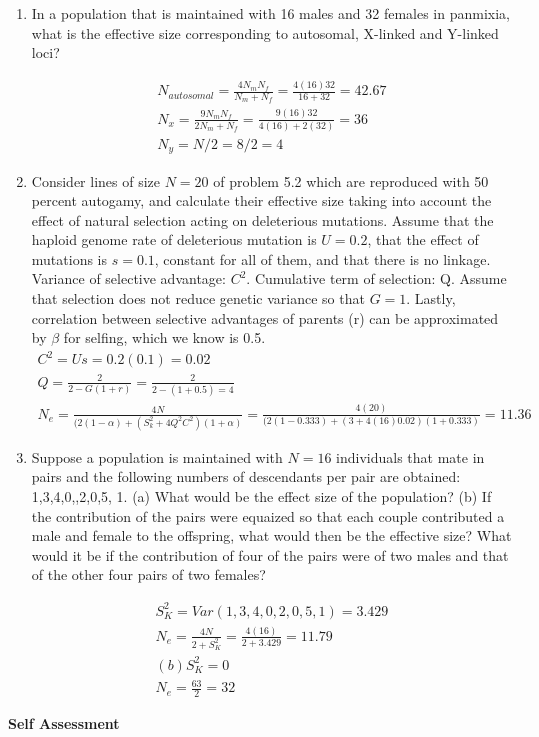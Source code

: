 \documentclass[12pt]{amsart}
\begin{document}
\begin{enumerate}
\item In a population that is maintained with 16 males and 32 females in panmixia, what is the effective size corresponding to autosomal, X-linked and Y-linked loci?

\begin{gather*}
N_{autosomal} = \frac{4N_mN_f}{N_m + N_f} = \frac{4(16)32}{16 + 32} =  42.67\\
N_x = \frac{9N_mN_f}{2N_m + N_f} = \frac{9(16)32}{4(16) + 2(32)} = 36\\
N_y = N/2 = 8/2 = 4
\end{gather*}

\item Consider lines of size $N = 20$ of problem 5.2 which are reproduced with 50 percent autogamy, and calculate their effective size taking into account the effect of natural selection acting on deleterious mutations. Assume that the haploid genome rate of deleterious mutation is $U = 0.2$, that the effect of mutations is $s = 0.1$, constant for all of them, and that there is no linkage.\\
Variance of selective advantage: $C^2$. Cumulative term of selection: Q. Assume that selection does not reduce genetic variance so that $G = 1$. Lastly, correlation between selective advantages of parents (r) can be approximated by $\beta$ for selfing, which we know is 0.5.
\begin{gather*}
C^2 = Us = 0.2(0.1) = 0.02\\
Q = \frac{2}{2 - G(1+r)} = \frac{2}{2 - (1+0.5) = 4}\\
N_e = \frac{4N}{(2(1-\alpha) + (S_k^2 + 4Q^2C^2)(1+\alpha)} = \frac{4(20)}{(2(1-0.333) + (3 + 4(16)0.02)(1+0.333)} = 11.36 
\end{gather*}

\item Suppose a population is maintained with $N=16$ individuals that mate in pairs and the following numbers of descendants per pair are obtained: 1,3,4,0,,2,0,5, 1. (a) What would be the effect size of the population? (b) If the contribution of the pairs were equaized so that each couple contributed a male and female to the offspring, what would then be the effective size? What would it be if the contribution of four of the pairs were of two males and that of the other four pairs of two females?

\begin{gather*}
S_K^2 = Var(1,3,4,0,2,0,5,1) = 3.429\\
N_e = \frac{4N}{2 + S_K^2} = \frac{4(16)}{2 + 3.429} = 11.79\\
(b) S_K^2 = 0\\
N_e = \frac{63}{2} = 32
\end{gather*}

\end{enumerate}

{\large \bf Self Assessment}


\medskip
\end{document}
